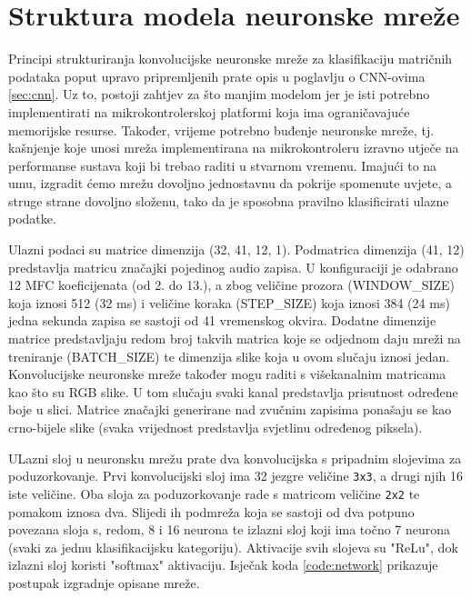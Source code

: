 \section{Struktura modela neuronske mreže}

Principi strukturiranja konvolucijske neuronske mreže za klasifikaciju matričnih podataka
poput upravo pripremljenih prate opis u poglavlju o CNN-ovima \ref{sec:cnn}.
Uz to, postoji zahtjev za što manjim modelom jer je isti potrebno implementirati na 
mikrokontrolerskoj platformi koja ima ograničavajuće memorijske resurse. Također,
vrijeme potrebno buđenje neuronske mreže, tj. kašnjenje koje unosi mreža
implementirana na mikrokontroleru izravno utječe na performanse sustava 
koji bi trebao raditi u stvarnom vremenu. Imajući to na umu, izgradit ćemo
mrežu dovoljno jednostavnu da pokrije spomenute uvjete, a struge strane dovoljno
složenu, tako da je sposobna pravilno klasificirati ulazne podatke.

Ulazni podaci su matrice dimenzija (32, 41, 12, 1). Podmatrica dimenzija (41, 12) 
predstavlja matricu značajki pojedinog audio zapisa. U konfiguraciji je odabrano 
12 MFC koeficijenata (od 2. do 13.), a zbog veličine prozora (WINDOW\_SIZE) 
koja iznosi 512 (32 ms) i veličine koraka (STEP\_SIZE) koja iznosi 384 (24 ms)
jedna sekunda zapisa se sastoji od 41 vremenskog okvira. Dodatne dimenzije matrice
predstavljaju redom broj takvih matrica koje se odjednom daju mreži na treniranje 
(BATCH\_SIZE) te dimenzija slike koja u ovom slučaju iznosi jedan. Konvolucijske
neuronske mreže također mogu raditi s višekanalnim matricama kao što su RGB slike. U tom 
slučaju svaki kanal predstavlja prisutnost određene boje u slici. Matrice značajki
generirane nad zvučnim zapisima ponašaju se kao crno-bijele slike (svaka vrijednost
predstavlja svjetlinu određenog piksela).

ULazni sloj u neuronsku mrežu prate dva konvolucijska s pripadnim slojevima za
poduzorkovanje. Prvi konvolucijski sloj ima 32 jezgre veličine \texttt{3x3},
a drugi njih 16 iste veličine. Oba sloja za poduzorkovanje rade s matricom
veličine \texttt{2x2} te pomakom iznosa dva. Slijedi ih podmreža koja se sastoji 
od dva potpuno povezana sloja 
s, redom, 8 i 16 neurona te izlazni sloj koji ima točno 7 neurona (svaki za jednu
klasifikacijsku kategoriju). Aktivacije svih slojeva su "ReLu", dok izlazni sloj
koristi "softmax" aktivaciju. Isječak koda \ref{code:network} prikazuje postupak
izgradnje opisane mreže.

